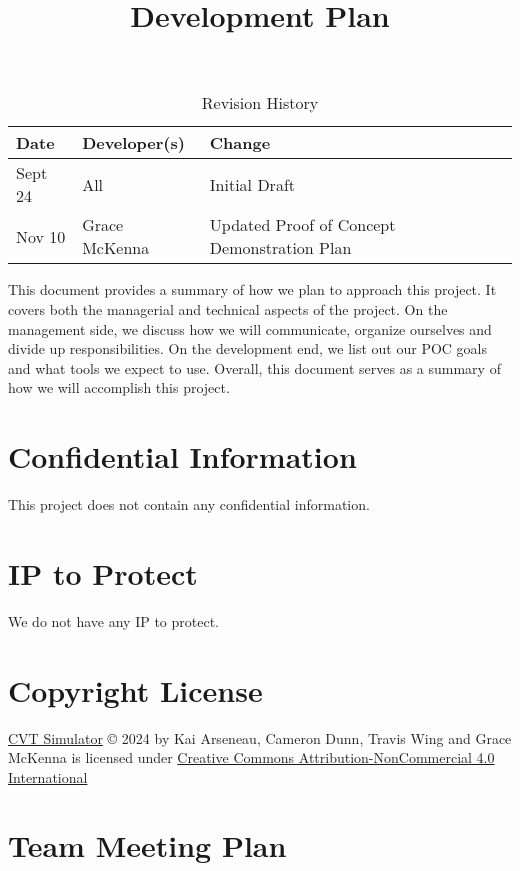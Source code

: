 \documentclass{article}
\title{Development Plan\\\progname}
\author{\authname}
\date{}
\begin{document}
\maketitle

\begin{table}[hp]
\caption{Revision History} \label{TblRevisionHistory}
\begin{tabularx}{\textwidth}{llX}
\toprule
\textbf{Date} & \textbf{Developer(s)} & \textbf{Change}\\
\midrule
Sept 24 & All & Initial Draft\\
Nov 10 & Grace McKenna & Updated Proof of Concept Demonstration Plan\\
\bottomrule
\end{tabularx}
\end{table}

\newpage{}

This document provides a summary of how we plan to approach this project.
It covers both the managerial and technical aspects of the project.
On the management side, we discuss how we will communicate, organize ourselves and divide up responsibilities.
On the development end, we list out our POC goals and what tools we expect to use.
Overall, this document serves as a summary of how we will accomplish this project.

\section{Confidential Information}

This project does not contain any confidential information.

\section{IP to Protect}

We do not have any IP to protect.

\section{Copyright License}

\href{https://github.com/gr812b/CVT-Simulator}{CVT Simulator} © 2024 by 
Kai Arseneau, Cameron Dunn, Travis Wing and Grace McKenna is licensed under 
\href{https://creativecommons.org/licenses/by-nc/4.0/?ref=chooser-v1}{Creative Commons Attribution-NonCommercial 4.0 International}

\section{Team Meeting Plan}
\end{document}

